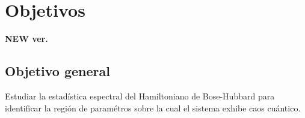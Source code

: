 \documentclass[spanish,titlepage,table]{practicas}
\begin{document}


\section{Objetivos}\label{sec:objetivos}
\textbf{NEW ver.}
 \subsection{Objetivo general}
 Estudiar la estadística espectral del Hamiltoniano de Bose-Hubbard para identificar la región de paramétros sobre la cual 
 el sistema exhibe caos cuántico.
\end{document}
